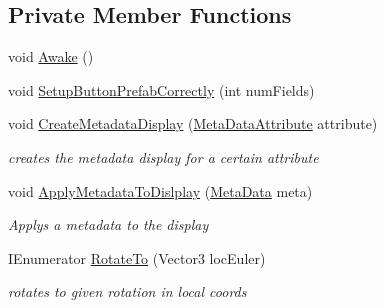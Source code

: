 \subsection*{Private Member Functions}
\begin{DoxyCompactItemize}
\item 
void \mbox{\hyperlink{class_meta_data_display_a45d9e14c784a8526dafd62f8efec02a7}{Awake}} ()
\item 
void \mbox{\hyperlink{class_meta_data_display_a1f06c004b7d217cbf4075b0b8eb1650e}{Setup\+Button\+Prefab\+Correctly}} (int num\+Fields)
\item 
void \mbox{\hyperlink{class_meta_data_display_a9306b452a284969cbca1414a034eb5c9}{Create\+Metadata\+Display}} (\mbox{\hyperlink{class_meta_data_attribute}{Meta\+Data\+Attribute}} attribute)
\begin{DoxyCompactList}\small\item\em creates the metadata display for a certain attribute \end{DoxyCompactList}\item 
void \mbox{\hyperlink{class_meta_data_display_ab982cb6123576aff6eae89a859899ad0}{Apply\+Metadata\+To\+Dislplay}} (\mbox{\hyperlink{class_meta_data}{Meta\+Data}} meta)
\begin{DoxyCompactList}\small\item\em Applys a metadata to the display \end{DoxyCompactList}\item 
I\+Enumerator \mbox{\hyperlink{class_meta_data_display_adee283ec76c3631bf535ae3e5071090b}{Rotate\+To}} (Vector3 loc\+Euler)
\begin{DoxyCompactList}\small\item\em rotates to given rotation in local coords \end{DoxyCompactList}\end{DoxyCompactItemize}
